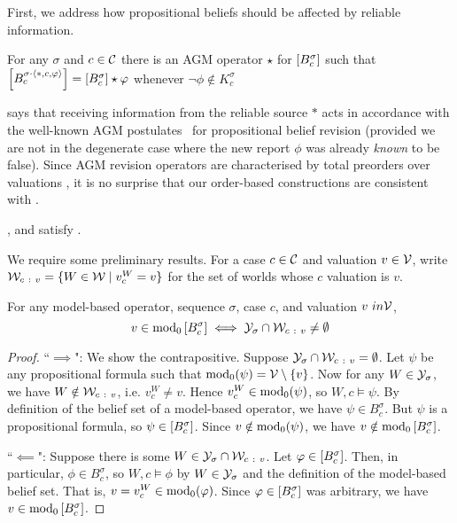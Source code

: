 First, we address how propositional beliefs should be affected by reliable
information.

\begin{postulate}[\agm{}]
    For any $\sigma$ and $c \in \mathcal{C}$ there is an AGM operator $\star$
    for $\left[{B^\sigma_c}\right]$ such that $\left[{B^{\sigma \cdot
    \langle {\ast, c, \varphi} \rangle}_c}\right] = \left[{B^\sigma_c}\right] \star \varphi$ whenever
    $\neg\phi \notin K^\sigma_c$
\end{postulate}

\agm{} says that receiving information from the reliable source $\ast$ acts in
accordance with the well-known AGM postulates~\cite{alchourron1985logic} for propositional belief
revision (provided we are not in the degenerate case where the new report
$\phi$ was already \emph{known} to be false). Since AGM revision operators are
characterised by total preorders over valuations
\cite{grove1988two,katsuno_1991}, it is no surprise that our order-based
constructions are consistent with \agm{}.


\begin{proposition}
    \label{prop:examples_satisfy_agm}
    \varbasedcond{}, \partbasedcond{} and \scorebasedop{}
    satisfy \agm{}.
\end{proposition}

We require some preliminary results. For a case $c \in \mathcal{C}$ and valuation $v \in
\mathcal{V}$, write $\mathcal{W}_{c\ :\ v} = \{W \in \mathcal{W} \mid v^W_c = v\}$ for the set of
worlds whose $c$ valuation is $v$.

\begin{lemma}
    \label{lemma:model_based_models_of_proppart}
    For any model-based operator, sequence $\sigma$, case $c$, and valuation
    $v\ in \mathcal{V}$,
    \[
        v \in \operatorname{mod}_0\left[{B^\sigma_c}\right]
        \iff
        \mathcal{Y}_\sigma \cap \mathcal{W}_{c\ :\  v} \ne \emptyset
    \]
\end{lemma}

\begin{proof}
    ``$\implies$": We show the contrapositive. Suppose $\mathcal{Y}_\sigma \cap \mathcal{W}_{c\
    :\ v} = \emptyset$. Let $\psi$ be any propositional formula such that
    $\operatorname{mod}_0(\psi) = \mathcal{V} \setminus \{v\}$. Now for any $W \in \mathcal{Y}_\sigma$,
    we have $W \notin \mathcal{W}_{c\ :\  v}$, i.e. $v^W_c \ne v$. Hence $v^W_c \in
    \operatorname{mod}_0(\psi)$, so $W, c \models \psi$. By definition of the belief set
    of a model-based operator, we have $\psi \in B^\sigma_c$. But $\psi$ is a
    propositional formula, so $\psi \in \left[{B^\sigma_c}\right]$. Since $v \notin
    \operatorname{mod}_0(\psi)$, we have $v \notin \operatorname{mod}_0\left[{B^\sigma_c}\right]$.

    ``$\impliedby$": Suppose there is some $W \in \mathcal{Y}_\sigma \cap \mathcal{W}_{c\ :\
    v}$. Let $\varphi \in \left[{B^\sigma_c}\right]$. Then, in particular, $\phi \in
    B^\sigma_c$, so $W, c \models \phi$ by $W \in \mathcal{Y}_\sigma$ and the definition
    of the model-based belief set. That is, $v = v^W_c \in \operatorname{mod}_0(\varphi)$.
    Since $\varphi \in \left[{B^\sigma_c}\right]$ was arbitrary, we have $v \in
    \operatorname{mod}_0\left[{B^\sigma_c}\right]$.

\end{proof}

